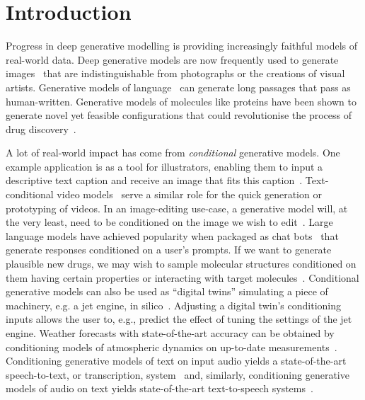 \chapter{Introduction}
\label{ch:introduction}

Progress in deep generative modelling is providing increasingly faithful models of real-world data. Deep generative models are now frequently used to generate images~\citep{rombach2022high,ho2022imagen} that are indistinguishable from photographs or the creations of visual artists. Generative models of language~\citep{wolf2020transformers} can generate long passages that pass as human-written. Generative models of molecules like proteins have been shown to generate novel yet feasible configurations that could revolutionise the process of drug discovery~\citep{hoogeboom2022equivariant,watson2022broadly}. 

A lot of real-world impact has come from \textit{conditional} generative models. 
One example application is as a tool for illustrators, enabling them to input a descriptive text caption and receive an image that fits this caption~\citep{rombach2022high,ho2022imagen}. Text-conditional video models~\citep{ho2022video} serve a similar role for the quick generation or prototyping of videos. In an image-editing use-case, a generative model will, at the very least, need to be conditioned on the image we wish to edit~\citep{rombach2022high,sheynin2023emu}. Large language models have achieved popularity when packaged as chat bots~\citep{wolf2020transformers} that generate responses conditioned on a user's prompts. If we want to generate plausible new drugs, we may wish to sample molecular structures conditioned on them having certain properties or interacting with target molecules~\citep{watson2022broadly}. Conditional generative models can also be used as ``digital twins'' simulating a piece of machinery, e.g. a jet engine, in silico~\citep{munk2022probabilistic,fuller2020digital}. Adjusting a digital twin's conditioning inputs allows the user to, e.g., predict the effect of tuning the settings of the jet engine. Weather forecasts with state-of-the-art accuracy can be obtained by conditioning models of atmospheric dynamics on up-to-date measurements~\citep{lam2022graphcast}. Conditioning generative models of text on input audio yields a state-of-the-art speech-to-text, or transcription, system~\citep{radford2023robust} and, similarly, conditioning generative models of audio on text yields state-of-the-art text-to-speech systems~\citep{tan2024naturalspeech}.


